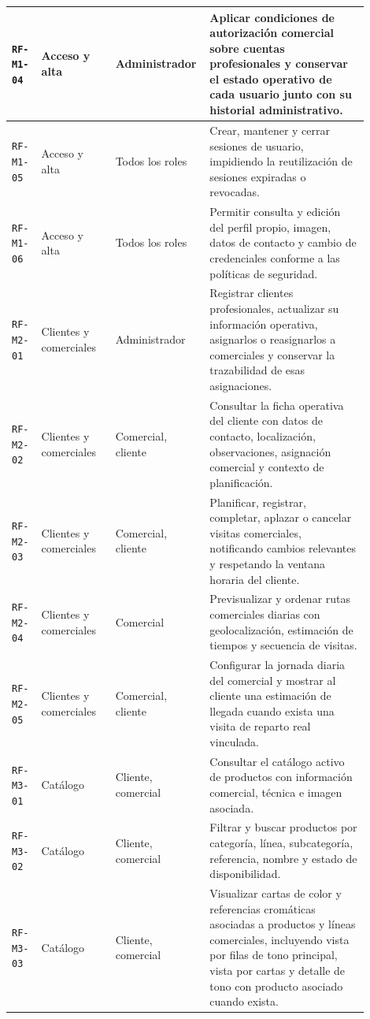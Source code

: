 {\begin{supertabular}{|>{\raggedright\arraybackslash}p{0.085\linewidth}|>{\raggedright\arraybackslash}p{0.205\linewidth}|>{\raggedright\arraybackslash}p{0.18\linewidth}|>{\raggedright\arraybackslash}p{0.43\linewidth}|}
\hline
\texttt{RF-M1-04} & Acceso y alta & Administrador & Aplicar condiciones de autorización comercial sobre cuentas profesionales y conservar el estado operativo de cada usuario junto con su historial administrativo. \\
\hline
\texttt{RF-M1-05} & Acceso y alta & Todos los roles & Crear, mantener y cerrar sesiones de usuario, impidiendo la reutilización de sesiones expiradas o revocadas. \\
\hline
\texttt{RF-M1-06} & Acceso y alta & Todos los roles & Permitir consulta y edición del perfil propio, imagen, datos de contacto y cambio de credenciales conforme a las políticas de seguridad. \\
\hline
{}
\texttt{RF-M2-01} & Clientes y comerciales & Administrador & Registrar clientes profesionales, actualizar su información operativa, asignarlos o reasignarlos a comerciales y conservar la trazabilidad de esas asignaciones. \\
\hline
\texttt{RF-M2-02} & Clientes y comerciales & Comercial, cliente & Consultar la ficha operativa del cliente con datos de contacto, localización, observaciones, asignación comercial y contexto de planificación. \\
\hline
\texttt{RF-M2-03} & Clientes y comerciales & Comercial, cliente & Planificar, registrar, completar, aplazar o cancelar visitas comerciales, notificando cambios relevantes y respetando la ventana horaria del cliente. \\
\hline
\texttt{RF-M2-04} & Clientes y comerciales & Comercial & Previsualizar y ordenar rutas comerciales diarias con geolocalización, estimación de tiempos y secuencia de visitas. \\
\hline
\texttt{RF-M2-05} & Clientes y comerciales & Comercial, cliente & Configurar la jornada diaria del comercial y mostrar al cliente una estimación de llegada cuando exista una visita de reparto real vinculada. \\
\hline
{}
\texttt{RF-M3-01} & Catálogo & Cliente, comercial & Consultar el catálogo activo de productos con información comercial, técnica e imagen asociada. \\
\hline
\texttt{RF-M3-02} & Catálogo & Cliente, comercial & Filtrar y buscar productos por categoría, línea, subcategoría, referencia, nombre y estado de disponibilidad. \\
\hline
\texttt{RF-M3-03} & Catálogo & Cliente, comercial & Visualizar cartas de color y referencias cromáticas asociadas a productos y líneas comerciales, incluyendo vista por filas de tono principal, vista por cartas y detalle de tono con producto asociado cuando exista. \\

\end{supertabular}}
